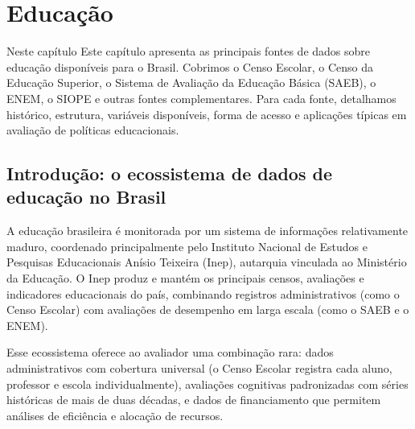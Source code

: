 
\chapter{Educação}

\begin{boxdestaque}{Neste capítulo}
Este capítulo apresenta as principais fontes de dados sobre educação disponíveis para o Brasil. Cobrimos o Censo Escolar, o Censo da Educação Superior, o Sistema de Avaliação da Educação Básica (SAEB), o ENEM, o SIOPE e outras fontes complementares. Para cada fonte, detalhamos histórico, estrutura, variáveis disponíveis, forma de acesso e aplicações típicas em avaliação de políticas educacionais.
\end{boxdestaque}

\section{Introdução: o ecossistema de dados de educação no Brasil}

A educação brasileira é monitorada por um sistema de informações relativamente maduro, coordenado principalmente pelo Instituto Nacional de Estudos e Pesquisas Educacionais Anísio Teixeira (Inep), autarquia vinculada ao Ministério da Educação. O Inep produz e mantém os principais censos, avaliações e indicadores educacionais do país, combinando registros administrativos (como o Censo Escolar) com avaliações de desempenho em larga escala (como o SAEB e o ENEM).

Esse ecossistema oferece ao avaliador uma combinação rara: dados administrativos com cobertura universal (o Censo Escolar registra cada aluno, professor e escola individualmente), avaliações cognitivas padronizadas com séries históricas de mais de duas décadas, e dados de financiamento que permitem análises de eficiência e alocação de recursos.

